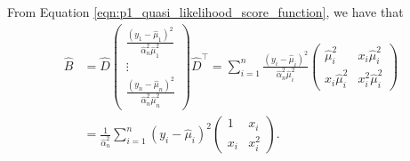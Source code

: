 \documentclass[letterpaper,11pt]{article}
\begin{document}
\begin{enumerate}
\begin{description}
    From Equation \ref{eqn:p1_quasi_likelihood_score_function}, we have that
    \begin{align}
      \hat{B}
      &= \hat{D}\begin{pmatrix}
        \frac{\left(y_1 - \hat{\mu}_1\right)^2}{\hat{\alpha}_n^2\hat{\mu}_1^2} \\
        \vdots \\
        \frac{\left(y_n - \hat{\mu}_n\right)^2}{\hat{\alpha}_n^2\hat{\mu}_n^2}
      \end{pmatrix}\hat{D}^\intercal =
      \sum_{i=1}^n \frac{\left(y_i - \hat{\mu}_i\right)^2}{\hat{\alpha}_n^2\hat{\mu}_i^2}
      \begin{pmatrix}
        \hat{\mu}_i^2 & x_i\hat{\mu}_i^2 \\
        x_i\hat{\mu}_i^2 & x_i^2\hat{\mu}_i^2
      \end{pmatrix} \nonumber\\
      &= \frac{1}{\hat{\alpha}_n^2}\sum_{i=1}^n\left(y_i-\hat{\mu}_i\right)^2
        \begin{pmatrix}
          1 & x_i\\
          x_i & x_i^2
        \end{pmatrix}.
    \end{align}
    
  \end{description}
\end{enumerate}
\end{document}
